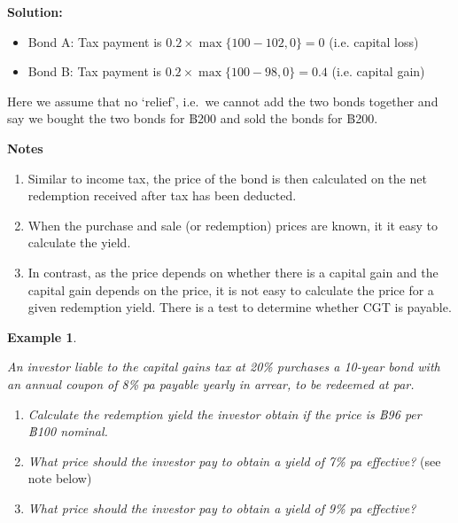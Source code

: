 \documentclass[
]{book}
\theoremstyle{definition}
\theoremstyle{definition}
\newtheorem{example}{Example}[chapter]
\theoremstyle{definition}
\theoremstyle{definition}
\theoremstyle{remark}
\begin{document}
\textbf{Solution:}

\begin{itemize}
\item
  Bond A: Tax payment is \(0.2 \times \max\{100 - 102,0 \} = 0\) (i.e.
  capital loss)
\item
  Bond B: Tax payment is \(0.2 \times \max\{100 - 98,0 \} = 0.4\) (i.e.
  capital gain)
\end{itemize}

Here we assume that no `relief', i.e.~we cannot add the two bonds
together and say we bought the two bonds for ฿200 and sold the bonds for
฿200.

\textbf{Notes}

\begin{enumerate}
\def\labelenumi{\arabic{enumi}.}
\item
  Similar to income tax, the price of the bond is then calculated on
  the net redemption received after tax has been deducted.
\item
  When the purchase and sale (or redemption) prices are known, it it
  easy to calculate the yield.
\item
  In contrast, as the price depends on whether there is a capital gain
  and the capital gain depends on the price, it is not easy to
  calculate the price for a given redemption yield. There is a test to
  determine whether CGT is payable.
\end{enumerate}

\begin{example}
\protect\hypertarget{exm:unlabeled-div-58}{}\label{exm:unlabeled-div-58}

\emph{An investor liable to the capital gains tax at 20\% purchases a 10-year
bond with an annual coupon of 8\% pa payable yearly in arrear, to be
redeemed at par.}

\begin{enumerate}
\def\labelenumi{\arabic{enumi}.}
\item
  \emph{Calculate the redemption yield the investor obtain if the price is
  ฿96 per ฿100 nominal.}
\item
  \emph{What price should the investor pay to obtain a yield of 7\% pa
  effective?} (see note below)
\item
  \emph{What price should the investor pay to obtain a yield of 9\% pa
  effective?}\\
\end{enumerate}

\end{example}
\end{document}
